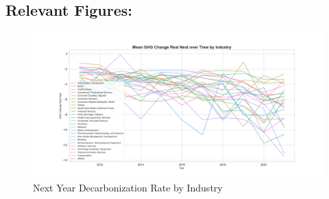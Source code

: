 


\subsection{Relevant Figures:}

\begin{figure}[H]
\centering
  \includegraphics[width=\textwidth]{figures/ghg_change_real_next_over_time_by_industry.png}
\caption{Next Year Decarbonization Rate by Industry}
\label{fig:industry_vs_ghg_change_real_next}
\end{figure}

